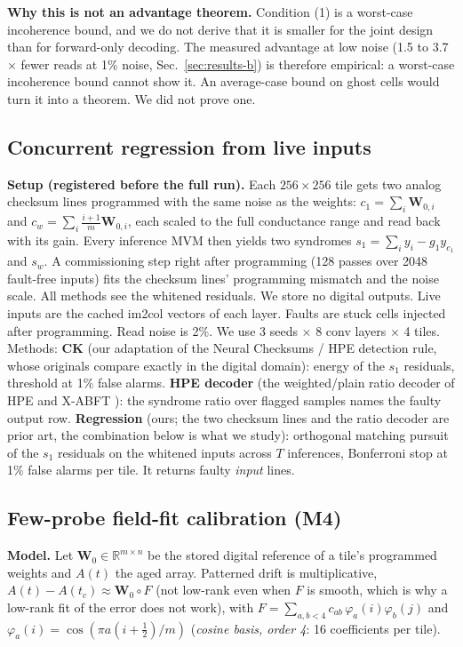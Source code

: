 \documentclass[journal]{IEEEtran}
\newcommand{\mfour}{\textsc{M4}}
\newcommand{\W}{\mathbf{W}}
\begin{document}
\textbf{Why this is not an advantage theorem.} Condition (1) is a worst-case incoherence bound, and we do not derive that it is smaller for the joint design than for forward-only decoding.
The measured advantage at low noise (1.5 to 3.7$\times$ fewer reads at 1\% noise, Sec.~\ref{sec:results-b}) is therefore empirical: a worst-case incoherence bound cannot show it.
An average-case bound on ghost cells would turn it into a theorem. We did not prove one.

\subsection{Concurrent regression from live inputs}
\label{sec:a8}
\textbf{Setup (registered before the full run).} Each $256\times256$ tile gets two analog checksum lines programmed with the same noise as the weights: $c_1=\sum_i \W_{0,i}$ and $c_w=\sum_i \tfrac{i+1}{m}\W_{0,i}$, each scaled to the full conductance range and read back with its gain. Every inference MVM then yields two syndromes $s_1=\sum_i y_i-g_1y_{c_1}$ and $s_w$. A commissioning step right after programming (128 passes over 2048 fault-free inputs) fits the checksum lines' programming mismatch and the noise scale. All methods see the whitened residuals. We store no digital outputs. Live inputs are the cached im2col vectors of each layer. Faults are stuck cells injected after programming. Read noise is 2\%. We use 3 seeds $\times$ 8 conv layers $\times$ 4 tiles.
Methods: \textbf{CK} (our adaptation of the Neural Checksums / HPE detection rule, whose originals compare exactly in the digital domain): energy of the $s_1$ residuals, threshold at 1\% false alarms. \textbf{HPE decoder} (the weighted/plain ratio decoder of HPE and X-ABFT \cite{liu2020xabft}): the syndrome ratio over flagged samples names the faulty output row. \textbf{Regression} (ours; the two checksum lines and the ratio decoder are prior art, the combination below is what we study): orthogonal matching pursuit of the $s_1$ residuals on the whitened inputs across $T$ inferences, Bonferroni stop at 1\% false alarms per tile. It returns faulty \emph{input} lines.

\subsection{Few-probe field-fit calibration (\mfour{})}
\label{sec:m4}
\textbf{Model.} Let $\W_0\in\mathbb R^{m\times n}$ be the stored digital reference of a tile's programmed weights and $A(t)$ the aged
array. Patterned drift is multiplicative, $A(t)-A(t_c)\approx\W_0\circ F$ (not low-rank even when $F$ is smooth, which is why a low-rank fit of the error does not work),
with $F=\sum_{a,b<4}c_{ab}\,\varphi_a(i)\varphi_b(j)$ and $\varphi_a(i)=\cos(\pi a(i+\tfrac12)/m)$ (\emph{cosine basis, order 4}: 16 coefficients per tile).
\end{document}
